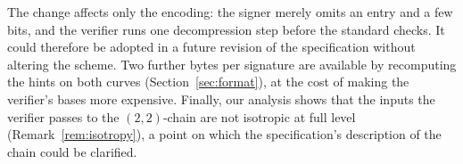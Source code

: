 \documentclass[version=submission]{iacrcc}
\begin{document}
The change affects only the encoding: the signer merely omits an entry
and a few bits, and the verifier runs one decompression step before the
standard checks. It could therefore be adopted in a future revision of
the specification without altering the scheme. Two further bytes per
signature are available by recomputing the hints on both curves
(Section~\ref{sec:format}), at the cost of making the verifier's bases
more expensive. Finally, our analysis shows that the inputs the verifier
passes to the $(2,2)$-chain are not isotropic at full level
(Remark~\ref{rem:isotropy}), a point on which the specification's
description of the chain could be clarified.


\end{document}
